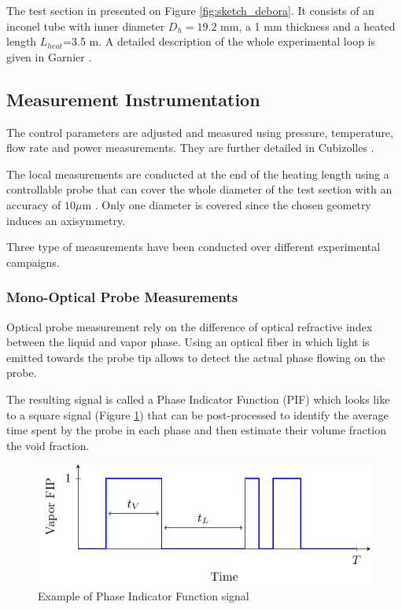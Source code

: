 The test section in presented on Figure \ref{fig:sketch_debora}. It consists of an inconel tube with inner diameter $D_{h}=19.2$ mm, a 1 mm thickness and a heated length $L_{heat}$=3.5 m. A detailed description of the whole experimental loop is given in Garnier \etal \cite{garnier_local_2001}.

\subsection{Measurement Instrumentation}

The control parameters are adjusted and measured using pressure, temperature, flow rate and power measurements. They are further detailed in Cubizolles \cite{Cubizolles_1996}.

\npar

The local measurements are conducted at the end of the heating length using a controllable probe that can cover the whole diameter of the test section with an accuracy of $10 \mu$m . Only one diameter is covered since the chosen geometry induces an axisymmetry.

Three type of measurements have been conducted over different experimental campaigns.

\subsubsection{Mono-Optical Probe Measurements}


Optical probe measurement rely on the difference of optical refractive index between the liquid and vapor phase. Using an optical fiber in which light is emitted towards the probe tip allows to detect the actual phase flowing on the probe. 

\npar

The resulting signal is called a Phase Indicator Function (PIF) which looks like to a square signal (Figure \ref{fig:FIP}) that can be post-processed to identify the average time spent by the probe in each phase and then estimate their volume fraction \eg the void fraction. 


\begin{figure}[!h]
\centering
\includegraphics[width=0.65\linewidth]{img/DEBORA/FIP.pdf}
\caption{Example of Phase Indicator Function signal}
\label{fig:FIP}
\end{figure}



